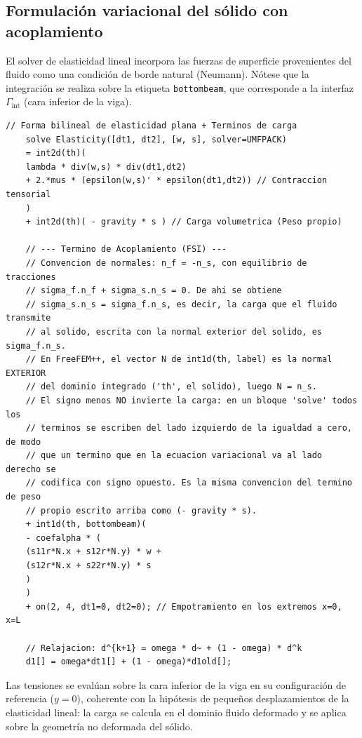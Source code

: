 \documentclass[12pt, letterpaper]{report}
\theoremstyle{definition}
\begin{document}
\subsection{Formulación variacional del sólido con acoplamiento}

El solver de elasticidad lineal incorpora las fuerzas de superficie provenientes del fluido como una condición de borde natural (Neumann). Nótese que la integración se realiza sobre la etiqueta \texttt{bottombeam}, que corresponde a la interfaz $\Gamma_{\text{int}}$ (cara inferior de la viga).

\begin{lstlisting}[caption={Solver de Elasticidad con acoplamiento fluido-estructura. \texttt{N} en FreeFEM++ es la normal exterior al dominio integrado (\texttt{th = solido}), por lo que $N = n_s$.}]
    // Forma bilineal de elasticidad plana + Terminos de carga
    solve Elasticity([dt1, dt2], [w, s], solver=UMFPACK)
    = int2d(th)(
    lambda * div(w,s) * div(dt1,dt2)
    + 2.*mus * (epsilon(w,s)' * epsilon(dt1,dt2)) // Contraccion tensorial
    )
    + int2d(th)( - gravity * s ) // Carga volumetrica (Peso propio)
    
    // --- Termino de Acoplamiento (FSI) ---
    // Convencion de normales: n_f = -n_s, con equilibrio de tracciones
    // sigma_f.n_f + sigma_s.n_s = 0. De ahi se obtiene
    // sigma_s.n_s = sigma_f.n_s, es decir, la carga que el fluido transmite
    // al solido, escrita con la normal exterior del solido, es sigma_f.n_s.
    // En FreeFEM++, el vector N de int1d(th, label) es la normal EXTERIOR
    // del dominio integrado ('th', el solido), luego N = n_s.
    // El signo menos NO invierte la carga: en un bloque 'solve' todos los
    // terminos se escriben del lado izquierdo de la igualdad a cero, de modo
    // que un termino que en la ecuacion variacional va al lado derecho se
    // codifica con signo opuesto. Es la misma convencion del termino de peso
    // propio escrito arriba como (- gravity * s).
    + int1d(th, bottombeam)(
    - coefalpha * (
    (s11r*N.x + s12r*N.y) * w +
    (s12r*N.x + s22r*N.y) * s
    )
    )
    + on(2, 4, dt1=0, dt2=0); // Empotramiento en los extremos x=0, x=L

    // Relajacion: d^{k+1} = omega * d~ + (1 - omega) * d^k
    d1[] = omega*dt1[] + (1 - omega)*d1old[];
\end{lstlisting}

Las tensiones se evalúan sobre la cara inferior de la viga en su configuración de referencia ($y = 0$), coherente con la hipótesis de pequeños desplazamientos de la elasticidad lineal: la carga se calcula en el dominio fluido deformado y se aplica sobre la geometría no deformada del sólido.
\end{document}
